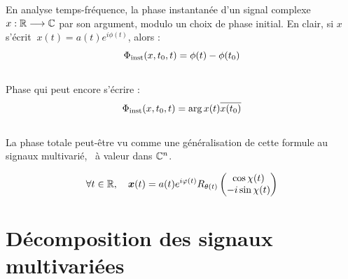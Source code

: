 En analyse temps-fréquence, la phase instantanée d'un signal complexe $x: \mathbb{R}\longrightarrow\mathbb{C}$ par son argument, modulo un choix de phase initial. En clair, si $x$ s'écrit $\ x(t) = a(t) e^{i\phi(t)}$, alors :
\begin{equation} \label{eq:phasei}
	\Phi_{\text{\normalfont inst}}(x,t_0,t) = \phi(t) - \phi(t_0)
\end{equation}
\\
Phase qui peut encore s'écrire :
\[\Phi_{\text{\normalfont inst}}(x,t_0,t) = \arg x(t)\overline{x(t_0)}\]
\\
La phase totale peut-être vu comme une généralisation de cette formule au signaux multivarié, \ie~à valeur dans $\mathbb{C}^n$.


\begin{equation}\label{eq:AM-FM-PM_2var}
	\forall t\in\mathbb{R},\quad \boldsymbol{x}(t) = a(t)e^{i\varphi(t)} R_{\theta(t)} \begin{pmatrix} \cos\chi(t) \\ -i\sin\chi(t) \end{pmatrix}
\end{equation}




\section{Décomposition des signaux multivariées} \label{sec:AM-FM-PM}
